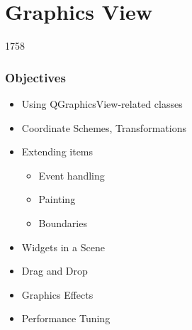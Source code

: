 %
%
%
%

\section{Graphics View}
\begin{slide}{1758}
\frametitle{Objectives}
\begin{itemize}
\item Using QGraphicsView-related classes
\item Coordinate Schemes, Transformations
\item Extending items
    \begin{itemize}
    \item Event handling
    \item Painting
    \item Boundaries
    \end{itemize}
\item Widgets in a Scene
\item Drag and Drop
\item Graphics Effects
\item Performance Tuning
\end{itemize}
\end{slide}

  







